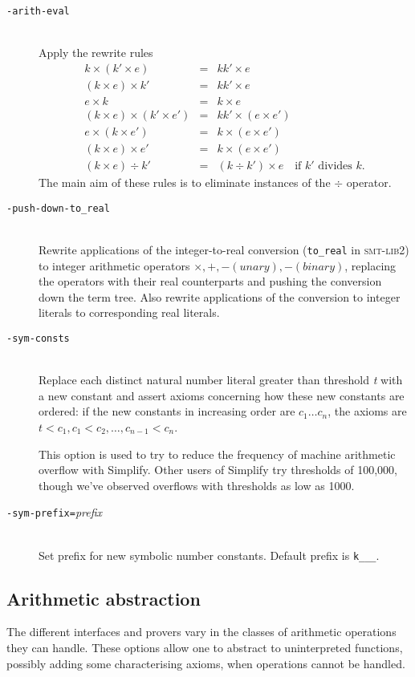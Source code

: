 \documentclass[12pt,fleqn]{article}
\newcommand{\smtlib}{\textsc{smt-lib}}
\newcommand{\optionb}[1]{\item[\texttt{-{#1}}]\ \\}
\newcommand{\optionv}[2]{\item[\texttt{-{#1}=}\mdseries\textit{#2}]\ \\}
\begin{document}
\begin{description}
\optionb{arith-eval}
  Apply the rewrite rules
  \begin{eqnarray*}
   k \times (k' \times e)   & =  &  kk' \times e \\
   (k \times e) \times k'   & =  &  kk' \times e \\
   e \times k               & =  &  k \times e \\
   (k \times e) \times (k' \times e') &  =  &  kk' \times (e \times e') \\
   e \times (k \times e')   &  = &  k \times (e \times e')  \\
   (k \times e) \times e'   & =  &  k \times (e \times e')  \\
  (k \times e) \div k'      & =  &   (k \div k') \times e  
      \quad\mbox{if $k'$ divides $k$}.
  \end{eqnarray*}
  The main aim of these rules is to eliminate instances of the $\div$
  operator.

\optionb{push-down-to\_real}
  Rewrite applications of the integer-to-real conversion (\verb+to_real+
  in \smtlib 2) to integer arithmetic operators $\times, +, - (unary), -
  (binary)$, replacing the operators with their real counterparts and
  pushing the conversion down the term tree.  Also rewrite applications
  of the conversion to integer literals to corresponding real literals.

  
\optionb{sym-consts}
  Replace each distinct natural number literal greater than 
  threshold \textit{t} with a new constant and assert axioms concerning
  how these new constants are ordered: if the new constants in increasing
  order are $c_1 \ldots c_n$, the axioms are 
  $t < c_1, c_1 < c_2, \ldots, c_{n-1} < c_n$.

  This option is used to try to reduce the frequency of machine
  arithmetic overflow with Simplify.  Other users of Simplify try
  thresholds of 100,000, though we've observed overflows with
  thresholds as low as 1000.

\optionv{sym-prefix}{prefix}
  Set prefix for new symbolic number constants.  Default prefix is
  \texttt{k\_\_\_}.


\end{description}



\subsection{Arithmetic abstraction}
The different interfaces and provers vary in the classes of arithmetic
operations they can handle.  These options allow one to abstract to
uninterpreted functions, possibly adding some characterising axioms,
when operations cannot be handled.
\end{document}
